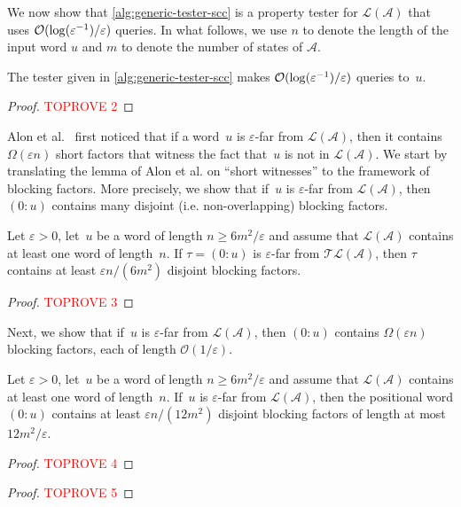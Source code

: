 \documentclass[letterpaper, USenglish, cleveref, autoref, thm-restate, numberwithinsect]{lipics-v2021}
\theoremstyle{theorem}
\theoremstyle{definition}
\newcommand{\Aa}{\mathcal{A}}
\newcommand{\cO}{\mathcal{O}}
\newcommand{\eps}{\varepsilon}
\newcommand{\lang}[1]{\mathcal{L}(#1)}
\newcommand{\timedlang}[1]{\mathcal{TL}( #1 )}
\newcommand{\timedword}[2]{(#1:#2)}
\newcommand{\twu}{\timedword{0}{u}}
\newcommand{\epslogeps}[1][]
{\ifthenelse{\equal{#1}{}}{\log(\eps^{-1})/\eps}{\log^{ #1 }(\eps^{-1})/\eps}}
\begin{document}
We now show that \cref{alg:generic-tester-scc} is a property tester for $\lang{\Aa}$ that uses $\cO(\epslogeps)$ queries. In what follows, we use $n$ to denote the length of the input word $u$ and $m$ to denote the number of states of $\Aa$.
\begin{claim}
    The tester given in \cref{alg:generic-tester-scc} makes $\cO(\epslogeps)$ queries to~$u$.
\end{claim}
\begin{proof}\textcolor{red}{TOPROVE 2}\end{proof}

Alon et al.~\cite[Lemma 2.6]{alon2001regular} first noticed that if a word~$u$ is $\eps$-far from $\lang{\Aa}$, then it contains $\Omega(\eps n)$ short factors that witness the fact that~$u$ is not in $\lang{\Aa}$.
We start by translating the lemma of Alon et al. on ``short witnesses'' to the framework of blocking factors.
More precisely, we show that if~$u$ is $\eps$-far from $\lang{\Aa}$, then $\twu$ contains many disjoint (i.e. non-overlapping) blocking factors.

\begin{lemma}\label{lemma:many-blocking}
    Let $\eps> 0$, let~$u$ be a word of length $n \ge 6m^2/\eps$ and assume that $\lang{\Aa}$ contains at least one word of length~$n$.
    If $\tau = \twu$ is $\eps$-far from $\timedlang{\Aa}$, then $\tau$ contains at least $\eps n/(6m^2)$ disjoint blocking factors.
\end{lemma}
\begin{proof}\textcolor{red}{TOPROVE 3}\end{proof}

Next, we show that if~$u$ is $\eps$-far from $\lang{\Aa}$, then $\twu$ contains $\Omega(\eps n)$ blocking factors, each of length $\cO(1/\eps)$.
\begin{lemma}\label{lemma:many-short-blocking} 
    Let $\eps> 0$, let~$u$ be a word of length $n \ge 6m^2/\eps$ and assume that $\lang{\Aa}$ contains at least one word of length~$n$.
    If~$u$ is $\eps$-far from $\lang{\Aa}$, then the positional word $\twu$ contains at least $\eps n/(12m^2)$ disjoint blocking factors of length at most $12m^2/\eps$.
\end{lemma}
\begin{proof}\textcolor{red}{TOPROVE 4}\end{proof}

\begin{proof}\textcolor{red}{TOPROVE 5}\end{proof}
\end{document}

